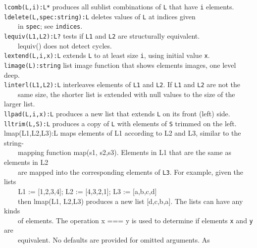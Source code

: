 \texttt{lcomb(L,i):L*} produces all sublist combinations of \texttt{L}
that have \texttt{i} elements.\\
\texttt{ldelete(L,spec:string):L} deletes values of \texttt{L} at
indices given\\
 \ \ \ \ in \texttt{spec}; see \texttt{indices}.\\
\texttt{lequiv(L1,L2):L?} tests if \texttt{L1} and \texttt{L2} are
structurally equivalent.\\
 \ \ \ \ lequiv() does not detect cycles.\\
\texttt{lextend(L,i,x):L} extends \texttt{L} to at least size
\texttt{i}, using initial value \texttt{x}.\\
\texttt{limage(L):string} list image function that shows
elements{\textquotesingle} images, one level deep.\\
\texttt{linterl(L1,L2):L} interleaves elements of \texttt{L1} and
\texttt{L2}. If \texttt{L1} and \texttt{L2} are not the\\
 \ \ \ \ same size, the shorter list is extended with null values to the
size of the larger list.\\
\texttt{llpad(L,i,x):L} produces a new list that extends \texttt{L} on
its front (left) side.\\
\texttt{lltrim(L,S):L} produces a copy of \texttt{L} with elements of
\texttt{S} trimmed on the left.\\
\textsf{lmap(L1,L2,L3):L} maps elements of \textsf{L1} according to
\textsf{L2} and \textsf{L3}, similar to the string-\\
 \ \ \ \ mapping function \textsf{map(s1, s2,s3)}. Elements in
\textsf{L1} that are the same as elements in \textsf{L2}\\
 \ \ \ \ are mapped into the corresponding elements of \texttt{L3}. For
example, given the lists\\
 \ \texttt{\ \ \ }\textsf{L1 := [1,2,3,4]; L2 := [4,3,2,1]; L3 :=
[{\textquotedbl}a{\textquotedbl},{\textquotedbl}b{\textquotedbl},{\textquotedbl}c{\textquotedbl},{\textquotedbl}d{\textquotedbl}]}\\
 \ \ \ \ then \textsf{lmap(L1, L2,L3)} produces a new list
\textsf{[{\textquotedbl}d{\textquotedbl},{\textquotedbl}c{\textquotedbl},{\textquotedbl}b{\textquotedbl},{\textquotedbl}a{\textquotedbl}]}.
The lists can have any kinds\\
 \ \ \ \ of elements. The operation \textsf{x === y} is used to
determine if elements \texttt{x} and \texttt{y} are\\
 \ \ \ \ equivalent. No defaults are provided for omitted arguments. As
